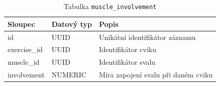 \begin{table}[ht!]
    \centering
    \begin{tabularx}{\textwidth}{|l|l|L|}
        \hline
        \textbf{Sloupec} & \textbf{Datový typ} & \textbf{Popis}                      \\ \hline
        id               & UUID                & Unikátní identifikátor záznamu      \\ \hline
        exercise\_id     & UUID                & Identifikátor cviku                 \\ \hline
        muscle\_id       & UUID                & Identifikátor svalu                 \\ \hline
        involvement      & NUMERIC             & Míra zapojení svalu při daném cviku \\ \hline
    \end{tabularx}
    \caption{Tabulka \texttt{muscle\_involvement}}
    \label{tab:muscle_involvement}
\end{table}
